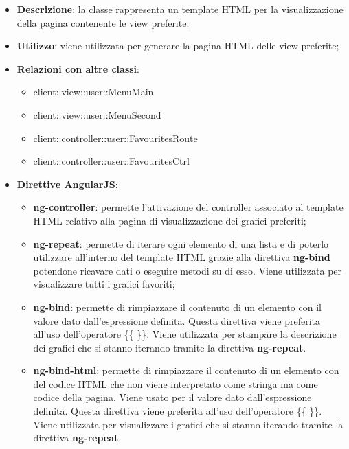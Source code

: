 			\begin{itemize}
				\item \textbf{Descrizione}: la classe rappresenta un template HTML per la visualizzazione della pagina contenente le view preferite;
				\item \textbf{Utilizzo}: viene utilizzata per generare la pagina HTML delle view preferite;
				\item \textbf{Relazioni con altre classi}:
					\begin{itemize}
						\item client::view::user::MenuMain
						\item client::view::user::MenuSecond
						\item client::controller::user::FavouritesRoute
						\item client::controller::user::FavouritesCtrl
					\end{itemize}
				\item \textbf{Direttive AngularJS}:
					\begin{itemize}
						\item \textbf{ng-controller}: permette l'attivazione del controller associato al template HTML relativo alla pagina di visualizzazione dei grafici preferiti;
						\item \textbf{ng-repeat}: permette di iterare ogni elemento di una lista e di poterlo utilizzare all'interno del template HTML grazie alla direttiva \textbf{ng-bind} potendone ricavare dati o eseguire metodi su di esso. Viene utilizzata per visualizzare tutti i grafici favoriti;
						\item \textbf{ng-bind}: permette di rimpiazzare il contenuto di un elemento con il valore dato dall'espressione definita. Questa direttiva viene preferita all'uso dell'operatore \{\{ \}\}. Viene utilizzata per stampare la descrizione dei grafici che si stanno iterando tramite la direttiva \textbf{ng-repeat}.
						\item \textbf{ng-bind-html}: permette di rimpiazzare il contenuto di un elemento con del codice HTML che non viene interpretato come stringa ma come codice della pagina. Viene usato per 
						il valore dato dall'espressione definita. Questa direttiva viene preferita all'uso dell'operatore \{\{ \}\}. Viene utilizzata per visualizzare i grafici che si stanno iterando tramite la direttiva \textbf{ng-repeat}.
					\end{itemize}
			\end{itemize}

